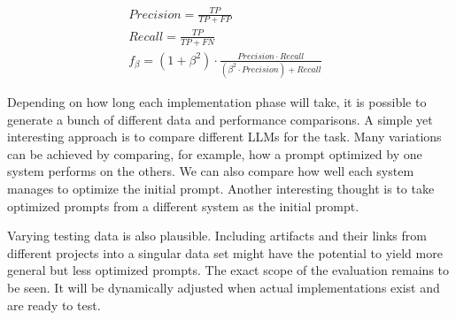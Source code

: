 
\begin{align}
    \label{eq:precision}
    Precision = \frac{TP}{TP + FP} &\\
    \label{eq:recall}
    Recall = \frac{TP}{TP + FN} &\\
    \label{eq:f_beta}
    f_{\beta} = (1 + \beta^2) \cdot \frac{Precision \cdot Recall}{(\beta^2 \cdot Precision) + Recall}
\end{align}



Depending on how long each implementation phase will take, it is possible to generate a bunch of different data and performance comparisons.
A simple yet interesting approach is to compare different LLMs for the task.
Many variations can be achieved by comparing, for example, how a prompt optimized by one system performs on the others.
We can also compare how well each system manages to optimize the initial prompt.
Another interesting thought is to take optimized prompts from a different system as the initial prompt.

Varying testing data is also plausible.
Including artifacts and their links from different projects into a singular data set might have the potential to yield more general but less optimized prompts. 
The exact scope of the evaluation remains to be seen.
It will be dynamically adjusted when actual implementations exist and are ready to test.
